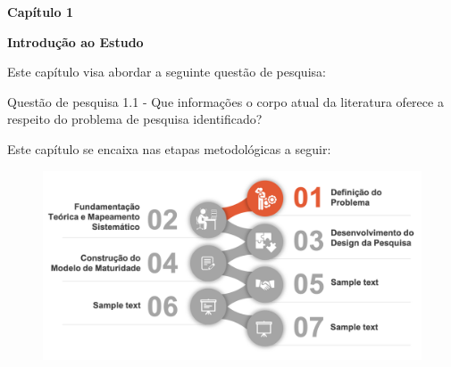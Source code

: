 \pagestyle{empty}
\vspace{18cm}
\begin{center}
\textbf{\Huge Capítulo 1}
\end{center}
\begin{center}
\textbf{\Huge Introdução ao Estudo}
\end{center}
\noindent\makebox[\linewidth]{\rule{\textwidth}{1pt}} 
\begin{flushleft}
Este capítulo visa abordar a seguinte questão de pesquisa:

Questão de pesquisa 1.1 - Que informações o corpo atual da literatura oferece a respeito do problema de pesquisa identificado?
\end{flushleft}
\noindent\makebox[\linewidth]{\rule{\textwidth}{1pt}} 

Este capítulo se encaixa nas etapas metodológicas a seguir:
\begin{figure}[ht]
\centering
\includegraphics[width=15cm]{images/metodologia-cap1.png}
\label{fig:metodologia-cap1}
\end{figure}
